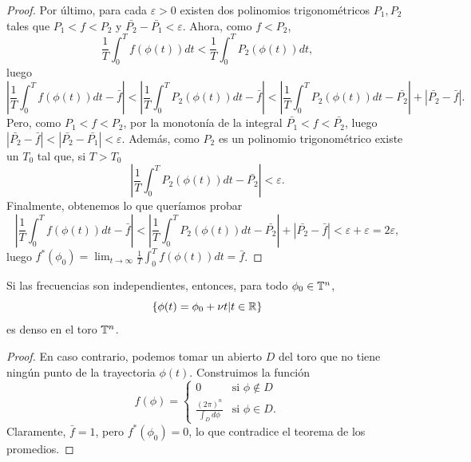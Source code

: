 \begin{proof}
    Por último, para cada $\varepsilon>0$ existen dos polinomios trigonométricos $P_1,P_2$ tales que $P_1<f<P_2$ y $\bar{P_2}-\bar{P_1}<\varepsilon$. Ahora, como $f<P_2$,
     \begin{equation*}
       \frac{1}{T}\int_0^T f(\phi(t))dt < \frac{1}{T}\int_0^T P_2(\phi(t))dt,
     \end{equation*}
     luego
     \begin{equation*}
       \left| \frac{1}{T}\int_0^T f(\phi(t))dt- \bar{f} \right| <\left| \frac{1}{T}\int_0^T P_2(\phi(t))dt- \bar{f} \right| < \left| \frac{1}{T}\int_0^T P_2(\phi(t))dt- \bar{P_2}\right| + |\bar{P_2}-\bar{f}|.
     \end{equation*}
     Pero, como $P_1<f<P_2$, por la monotonía de la integral $\bar{P_1}<f<\bar{P_2}$, luego $|\bar{P_2}-\bar{f}|<|\bar{P_2}-\bar{P_1}|<\varepsilon$. Además, como $P_2$ es un polinomio trigonométrico existe un $T_0$ tal que, si $T>T_0$
     \begin{equation*}
       \left| \frac{1}{T}\int_0^T P_2(\phi(t))dt- \bar{P_2}\right| < \varepsilon .
     \end{equation*}
     Finalmente, obtenemos lo que queríamos probar
     \begin{equation*}
       \left| \frac{1}{T}\int_0^T f(\phi(t))dt- \bar{f} \right| <\left| \frac{1}{T}\int_0^T P_2(\phi(t))dt- \bar{P_2}\right| + |\bar{P_2}-\bar{f}|<\varepsilon + \varepsilon = 2\varepsilon,
     \end{equation*}
     luego $f^*(\phi_0)=\lim_{t\rightarrow \infty}\frac{1}{T}\int_0^T f(\phi(t)) dt = \bar{f}$.
\end{proof}
\begin{corol}
  Si las frecuencias son independientes, entonces, para todo $\phi_0 \in \mathbb{T}^n$, \[\{\phi(t)=\phi_0+\nu t|t\in \mathbb{R}\}\] es denso en el toro $\mathbb{T}^n$.
\end{corol}
\begin{proof}
  En caso contrario, podemos tomar un abierto $D$ del toro que no tiene ningún punto de la trayectoria $\phi(t)$. Construimos la función 
  \begin{equation*}
    f(\phi)=\left\lbrace
    \begin{array}{ll}
      0 & \text{si } \phi \not\in D \\
      \frac{(2\pi)^n}{\int_D d\phi} & \text{si } \phi \in D.
    \end{array}
    \right.
  \end{equation*}
  Claramente, $\bar{f}=1$, pero $f^*(\phi_0)=0$, lo que contradice el teorema de los promedios.
\end{proof}
